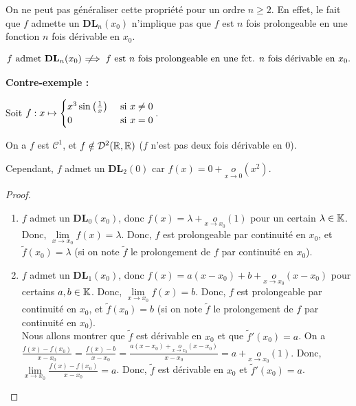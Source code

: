 \documentclass[12pt, a4paper]{report}
\begin{document}
\begin{attention}
    On ne peut pas généraliser cette propriété pour un ordre $n \ge 2$. En effet, le fait que $f$ admette un $\mathbf{DL}_n(x_0)$ n'implique pas que $f$ est $n$ fois prolongeable en une fonction $n$ fois dérivable en $x_0$.

    $$f \text{ admet } \mathbf{DL}_n(x_0) \;\not\!\!\!\implies f \text{ est } n \text{ fois prolongeable en une fct. } n \text{ fois dérivable en } x_0.$$

    \textbf{Contre-exemple :}

    Soit $f:x\mapsto \begin{cases} x^3 \sin\left(\frac{1}{x}\right) & \text{ si } x \ne 0\\ 0 & \text{ si } x=0 \end{cases}$.

    On a $f$ est $\mathcal{C}^1$, et $f \notin \mathcal{D}^2(\mathbb{R},\mathbb{R})$ ($f$ n'est pas deux fois dérivable en $0$). 
    
    Cependant, $f$ admet un $\mathbf{DL}_2(0)$ car $f(x) = 0 + \underset{x\to 0}{o}(x^2)$.
\end{attention}

\begin{proof}
    \begin{enumerate}
        \item $f$ admet un $\mathbf{DL}_0(x_0)$, donc $f(x)=\lambda + \underset{x\to x_0}{o}(1)$ pour un certain $\lambda \in \mathbb{K}$. Donc, $\lim\limits_{x\to x_0} f(x) = \lambda$. Donc, $f$ est prolongeable par continuité en $x_0$, et $\tilde{f}(x_0) = \lambda$ (si on note $\tilde{f}$ le prolongement de $f$ par continuité en $x_0$).
        \item $f$ admet un $\mathbf{DL}_1(x_0)$, donc $f(x) = a(x-x_0) + b + \underset{x\to x_0}{o}(x - x_0)$ pour certains $a,b \in \mathbb{K}$. Donc, $\lim\limits_{x\to x_0} f(x) = b$. Donc, $f$ est prolongeable par continuité en $x_0$, et $\tilde{f}(x_0) = b$ (si on note $\tilde{f}$ le prolongement de $f$ par continuité en $x_0$).\\Nous allons montrer que $\tilde{f}$ est dérivable en $x_0$ et que $\tilde{f}'(x_0) = a$. On a $\frac{f(x)-f(x_0)}{x-x_0} = \frac{f(x) - b}{x-x_0} = \frac{a(x-x_0) + \underset{x\to x_0}{o}(x-x_0)}{x-x_0} = a + \underset{x\to x_0}{o}(1)$. Donc, $\lim\limits_{x\to x_0} \frac{f(x)-f(x_0)}{x-x_0} = a$. Donc, $\tilde{f}$ est dérivable en $x_0$ et $\tilde{f}'(x_0) = a$.
    \end{enumerate}
\end{proof}
\end{document}
